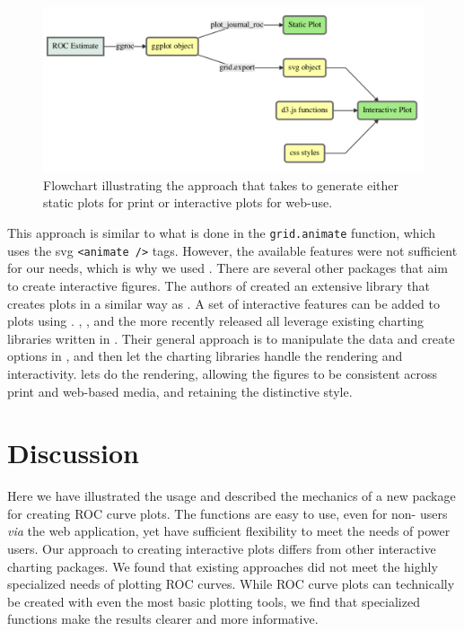 \documentclass[article]{jss}
\begin{document}
\begin{figure}[ht]
\centering
\includegraphics{diagram.pdf}
\caption{Flowchart illustrating the approach that  takes to generate either static plots for print or interactive plots for web-use. \label{flow}}
\end{figure}

This approach is similar to what is done in the 
\texttt{grid.animate} function, which uses the svg
\texttt{\textless{}animate /\textgreater{}} tags. However, the available
features were not sufficient for our needs, which is why we used
. There are several other  packages that aim to
create interactive figures. The authors of  \citep{animint}
created an extensive  library that creates plots in
a similar way as . A set of interactive features can be
added to plots using .  \citep{ggvis},
 \citep{rcharts}, and the more recently released
 \citep{htmlwidgets} all leverage existing charting
libraries written in . Their general approach is to
manipulate the data and create options in , and then let the
charting libraries handle the rendering and interactivity. 
lets  do the rendering, allowing the figures to be
consistent across print and web-based media, and retaining the
distinctive  style.

\section{Discussion}\label{discussion}

Here we have illustrated the usage and described the mechanics of a new
 package for creating ROC curve plots. The functions are
easy to use, even for non- users \emph{via} the web
application, yet have sufficient flexibility to meet the needs of power
users. Our approach to creating interactive plots differs from other
interactive charting packages. We found that existing approaches did not
meet the highly specialized needs of plotting ROC curves. While ROC
curve plots can technically be created with even the most basic plotting
tools, we find that specialized functions make the results clearer and
more informative.


%

\end{document}

